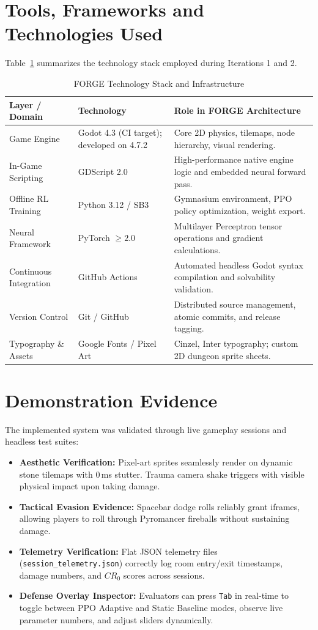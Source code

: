 \section{Tools, Frameworks and Technologies Used}
Table~\ref{tab:tech_stack} summarizes the technology stack employed during Iterations 1 and 2.

\begin{table}[!htbp]
\centering
\caption{FORGE Technology Stack and Infrastructure}
\label{tab:tech_stack}
\small
\begin{tabular}{p{}p{}p{}}
\toprule
\textbf{Layer / Domain} & \textbf{Technology} & \textbf{Role in FORGE Architecture} \\
\midrule
Game Engine & Godot 4.3 (CI target); developed on 4.7.2 & Core 2D physics, tilemaps, node hierarchy, visual rendering. \\
In-Game Scripting & GDScript 2.0 & High-performance native engine logic and embedded neural forward pass. \\
Offline RL Training & Python 3.12 / SB3 & Gymnasium environment, PPO policy optimization, weight export. \\
Neural Framework & PyTorch $\ge 2.0$ & Multilayer Perceptron tensor operations and gradient calculations. \\
Continuous Integration & GitHub Actions & Automated headless Godot syntax compilation and solvability validation. \\
Version Control & Git / GitHub & Distributed source management, atomic commits, and release tagging. \\
Typography \& Assets & Google Fonts / Pixel Art & Cinzel, Inter typography; custom 2D dungeon sprite sheets. \\
\bottomrule
\end{tabular}
\end{table}

\section{Demonstration Evidence}
The implemented system was validated through live gameplay sessions and headless test suites:
\begin{itemize}
    \item \textbf{Aesthetic Verification:} Pixel-art sprites seamlessly render on dynamic stone tilemaps with $0$\,ms stutter. Trauma camera shake triggers with visible physical impact upon taking damage.
    \item \textbf{Tactical Evasion Evidence:} Spacebar dodge rolls reliably grant iframes, allowing players to roll through Pyromancer fireballs without sustaining damage.
    \item \textbf{Telemetry Verification:} Flat JSON telemetry files (\texttt{session\_telemetry.json}) correctly log room entry/exit timestamps, damage numbers, and $CR_0$ scores across sessions.
    \item \textbf{Defense Overlay Inspector:} Evaluators can press \texttt{Tab} in real-time to toggle between PPO Adaptive and Static Baseline modes, observe live parameter numbers, and adjust sliders dynamically.
\end{itemize}

